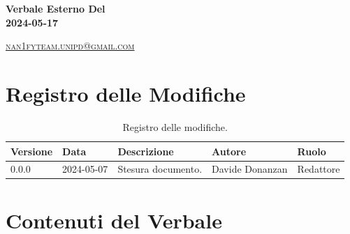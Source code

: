 \documentclass[8pt]{article}
\begin{document}
\begin{titlepage}
\begin{minipage}[t]{0.47\textwidth}
{		}
		\vspace{4mm}\vspace{4mm}
	\end{minipage}
	\vspace{4cm}
	\begin{center}
		\begin{flushright}
			{\fontsize{30pt}{52pt}\selectfont \textbf{Verbale Esterno Del\\2024-05-17\\}} %
		\end{flushright}
		\vspace{3cm}
	\end{center}
	\vspace{8.5 cm}
	{\small \textsc{\href{mailto: nan1fyteam.unipd@gmail.com}{nan1fyteam.unipd@gmail.com}}}
\end{titlepage}

\pagestyle{mystyle}
\section*{Registro delle Modifiche}
\begin{table}[ht!]	
	\centering
	\begin{tabular}{p{1.2cm} p{2cm} p{6cm} p{3cm} p{2cm}}
		\toprule
		\textbf{Versione}& \textbf{Data} & \textbf{Descrizione} & \textbf{Autore} & \textbf{Ruolo} \\
		\midrule	 
        0.0.0 & 2024-05-07 & Stesura documento.  & Davide Donanzan & Redattore \\
		\bottomrule
	\end{tabular}
	\caption{Registro delle modifiche.}
	\label{table:Registro delle modifiche}
\end{table}
\newpage
\tableofcontents
\clearpage
\newpage
\justifying
\section{Contenuti del Verbale}
\end{document}
